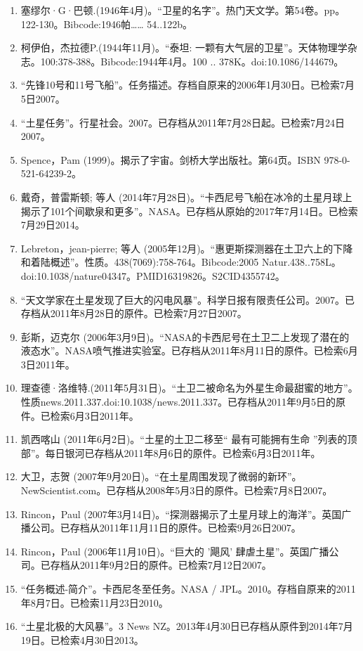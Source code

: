 \begin{enumerate}
\item 塞缪尔·G·巴顿.(1946年4月)。“卫星的名字”。热门天文学。第54卷。pp。 122-130。Bibcode:1946帕…… 54..122b。
\item 柯伊伯，杰拉德P.(1944年11月)。“泰坦: 一颗有大气层的卫星”。天体物理学杂志。100:378-388。Bibcode:1944年4月。100 .. 378K。doi:10.1086/144679。
\item “先锋10号和11号飞船”。任务描述。存档自原来的2006年1月30日。已检索7月5日2007。
\item “土星任务”。行星社会。2007。已存档从2011年7月28日起。已检索7月24日2007。
\item Spence，Pam (1999)。揭示了宇宙。剑桥大学出版社。第64页。ISBN 978-0-521-64239-2。
\item 戴奇，普雷斯顿; 等人 (2014年7月28日)。“卡西尼号飞船在冰冷的土星月球上揭示了101个间歇泉和更多”。NASA。已存档从原始的2017年7月14日。已检索7月29日2014。
\item Lebreton，jean-pierre; 等人 (2005年12月)。“惠更斯探测器在土卫六上的下降和着陆概述”。性质。438(7069):758-764。Bibcode:2005 Natur.438..758L。doi:10.1038/nature04347。PMID16319826。S2CID4355742。  
\item “天文学家在土星发现了巨大的闪电风暴”。科学日报有限责任公司。2007。已存档从2011年8月28日的原件。已检索7月27日2007。
\item 彭斯，迈克尔 (2006年3月9日)。“NASA的卡西尼号在土卫二上发现了潜在的液态水”。NASA喷气推进实验室。已存档从2011年8月11日的原件。已检索6月3日2011年。
\item 理查德·洛维特.(2011年5月31日)。“土卫二被命名为外星生命最甜蜜的地方”。性质news.2011.337.doi:10.1038/news.2011.337。已存档从2011年9月5日的原件。已检索6月3日2011年。
\item 凯西喀山 (2011年6月2日)。“土星的土卫二移至“ 最有可能拥有生命 ”列表的顶部”。每日银河已存档从2011年8月6日的原件。已检索6月3日2011年。
\item 大卫，志贺 (2007年9月20日)。“在土星周围发现了微弱的新环”。NewScientist.com。已存档从2008年5月3日的原件。已检索7月8日2007。
\item Rincon，Paul (2007年3月14日)。“探测器揭示了土星月球上的海洋”。英国广播公司。已存档从2011年11月11日的原件。已检索9月26日2007。
\item Rincon，Paul (2006年11月10日)。“巨大的 '飓风' 肆虐土星”。英国广播公司。已存档从2011年9月2日的原件。已检索7月12日2007。
\item “任务概述-简介”。卡西尼冬至任务。NASA / JPL。2010。存档自原来的2011年8月7日。已检索11月23日2010。
\item “土星北极的大风暴”。3 News NZ。2013年4月30日已存档从原件到2014年7月19日。已检索4月30日2013。

\end{enumerate}
